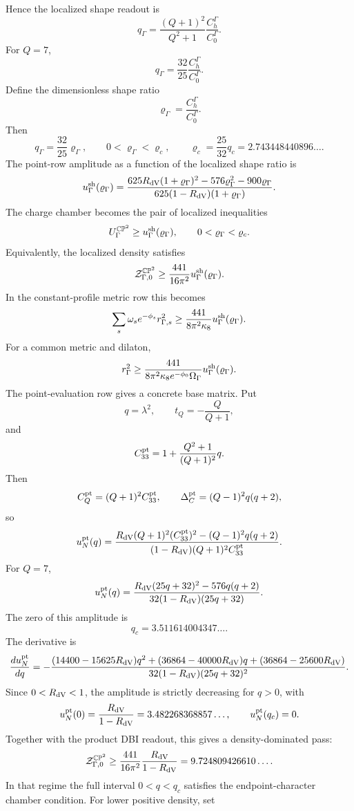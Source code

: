 \documentclass[11pt]{article}
\theoremstyle{definition}
\theoremstyle{remark}
\newcommand{\CP}{\mathbb{CP}}
\begin{document}
Hence the localized shape readout is
\[
  q_\Gamma
  =
  \frac{(Q+1)^2}{Q^2+1}
  \frac{C_h^\Gamma}{C_0^\Gamma}.
\]
For \(Q=7\),
\[
  q_\Gamma=\frac{32}{25}\frac{C_h^\Gamma}{C_0^\Gamma}.
\]
Define the dimensionless shape ratio
\[
  \varrho_\Gamma=\frac{C_h^\Gamma}{C_0^\Gamma}.
\]
Then
\[
  q_\Gamma=\frac{32}{25}\varrho_\Gamma,
  \qquad
  0<\varrho_\Gamma<\varrho_c,
  \qquad
  \varrho_c=\frac{25}{32}q_c=2.743448440896\ldots .
\]
The point-row amplitude as a function of the localized shape ratio is
\[
  u_\Gamma^{\rm sh}(\varrho_\Gamma)
  =
  \frac{
  625R_{\rm dV}(1+\varrho_\Gamma)^2
  -576\varrho_\Gamma^2-900\varrho_\Gamma}
  {625(1-R_{\rm dV})(1+\varrho_\Gamma)} .
\]
The charge chamber becomes the pair of localized inequalities
\[
  U_\Gamma^{\CP^2}\ge u_\Gamma^{\rm sh}(\varrho_\Gamma),
  \qquad
  0<\varrho_\Gamma<\varrho_c .
\]
Equivalently, the localized density satisfies
\[
  {\cal Z}_{\Gamma,0}^{\CP^2}
  \ge
  \frac{441}{16\pi^2}
  u_\Gamma^{\rm sh}(\varrho_\Gamma).
\]
In the constant-profile metric row this becomes
\[
  \sum_s\omega_s e^{-\phi_s}r_{\Gamma,s}^2
  \ge
  \frac{441}{8\pi^2\kappa_8}
  u_\Gamma^{\rm sh}(\varrho_\Gamma).
\]
For a common metric and dilaton,
\[
  r_\Gamma^2
  \ge
  \frac{441}{8\pi^2\kappa_8e^{-\phi_0}\Omega_\Gamma}
  u_\Gamma^{\rm sh}(\varrho_\Gamma).
\]
The point-evaluation row gives a concrete base matrix.  Put
\[
  q=\lambda^2,
  \qquad
  t_Q=-\frac{Q}{Q+1},
\]
and
\[
  C_{33}^{\rm pt}
  =
  1+\frac{Q^2+1}{(Q+1)^2}q .
\]
Then
\[
  C_Q^{\rm pt}=(Q+1)^2C_{33}^{\rm pt},
  \qquad
  \Delta_C^{\rm pt}=(Q-1)^2q(q+2),
\]
so
\[
  u_N^{\rm pt}(q)
  =
  \frac{
  R_{\rm dV}(Q+1)^2(C_{33}^{\rm pt})^2
  -(Q-1)^2q(q+2)}
  {(1-R_{\rm dV})(Q+1)^2C_{33}^{\rm pt}}.
\]
For \(Q=7\),
\[
  u_N^{\rm pt}(q)
  =
  \frac{R_{\rm dV}(25q+32)^2-576q(q+2)}
       {32(1-R_{\rm dV})(25q+32)}.
\]
The zero of this amplitude is
\[
  q_c=3.511614004347\ldots .
\]
The derivative is
\[
  \frac{d u_N^{\rm pt}}{dq}
  =
  -\frac{
  (14400-15625R_{\rm dV})q^2
  +(36864-40000R_{\rm dV})q
  +(36864-25600R_{\rm dV})}
  {32(1-R_{\rm dV})(25q+32)^2}.
\]
Since \(0<R_{\rm dV}<1\), the amplitude is strictly decreasing for
\(q>0\), with
\[
  u_N^{\rm pt}(0)=\frac{R_{\rm dV}}{1-R_{\rm dV}}
  =
  3.482268368857\ldots,
  \qquad
  u_N^{\rm pt}(q_c)=0.
\]
Together with the product DBI readout, this gives a density-dominated pass:
\[
  {\cal Z}_{\Gamma,0}^{\CP^2}
  \ge
  \frac{441}{16\pi^2}
  \frac{R_{\rm dV}}{1-R_{\rm dV}}
  =
  9.724809426610\ldots .
\]
In that regime the full interval \(0<q<q_c\) satisfies the
endpoint-character chamber condition.  For lower positive density, set
\end{document}
